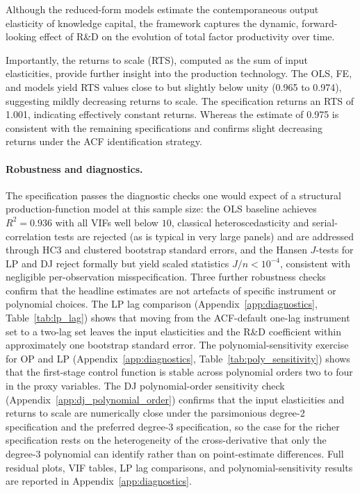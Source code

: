 \documentclass[a4paper, 12pt]{article}
\begin{document}
Although the reduced-form models estimate the contemporaneous output elasticity of knowledge capital, the \textcite{doraszelski2013r} framework captures the dynamic, forward-looking effect of R\&D on the evolution of total factor productivity over time.

Importantly, the returns to scale (RTS), computed as the sum of input elasticities, provide further insight into the production technology. The OLS, FE, and \textcite{doraszelski2013r} models yield RTS values close to but slightly below unity (0.965 to 0.974), suggesting mildly decreasing returns to scale. The \textcite{olley1992dynamics} specification returns an RTS of 1.001, indicating effectively constant returns. Whereas the \textcite{levinsohn2003estimating} estimate of 0.975 is consistent with the remaining specifications and confirms slight decreasing returns under the ACF identification strategy.

\paragraph{Robustness and diagnostics.} The specification passes the diagnostic checks one would expect of a structural production-function model at this sample size: the OLS baseline achieves $R^2 = 0.936$ with all VIFs well below $10$, classical heteroscedasticity and serial-correlation tests are rejected (as is typical in very large panels) and are addressed through HC3 and clustered bootstrap standard errors, and the Hansen $J$-tests for LP and DJ reject formally but yield scaled statistics $J/n<10^{-4}$, consistent with negligible per-observation misspecification. Three further robustness checks confirm that the headline estimates are not artefacts of specific instrument or polynomial choices. The LP lag comparison (Appendix~\ref{app:diagnostics}, Table~\ref{tab:lp_lag}) shows that moving from the ACF-default one-lag instrument set to a two-lag set leaves the input elasticities and the R\&D coefficient within approximately one bootstrap standard error. The polynomial-sensitivity exercise for OP and LP (Appendix~\ref{app:diagnostics}, Table~\ref{tab:poly_sensitivity}) shows that the first-stage control function is stable across polynomial orders two to four in the proxy variables. The DJ polynomial-order sensitivity check (Appendix~\ref{app:dj_polynomial_order}) confirms that the input elasticities and returns to scale are numerically close under the parsimonious degree-2 specification and the preferred degree-3 specification, so the case for the richer specification rests on the heterogeneity of the cross-derivative that only the degree-3 polynomial can identify rather than on point-estimate differences. Full residual plots, VIF tables, LP lag comparisons, and polynomial-sensitivity results are reported in Appendix~\ref{app:diagnostics}.
\end{document}
